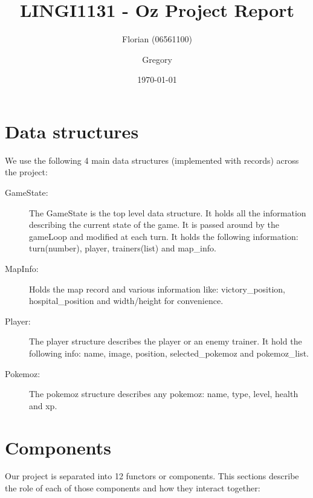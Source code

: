 \documentclass[10pt, a4paper]{article}
\author{Florian \bsc{Thuin} (06561100) \and Gregory \bsc{Vander Schueren}}
\title{LINGI1131 - Oz Project Report}
\date{\today}
\begin{document}
\maketitle

\section{Data structures}

We use the following 4 main data structures (implemented with records) across the project:

\begin{description}
  \item [GameState:] The GameState is the top level data structure. It holds all the information describing the current state of the game. It is passed around by the gameLoop and modified at each turn. It holds the following information: turn(number), player, trainers(list) and map\_info.
  \item [MapInfo:] Holds the map record and various information like: victory\_position, hospital\_position and width/height for convenience.
  \item [Player:] The player structure describes the player or an enemy trainer. It hold the following info: name, image, position, selected\_pokemoz and pokemoz\_list.
  \item [Pokemoz:] The pokemoz structure describes any pokemoz: name, type, level, health and xp.

\end{description}

\section{Components}

Our project is separated into 12 functors or \og{}components\fg{}. This sections describe the role of each of those components and how they interact together:
\end{document}
